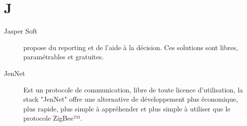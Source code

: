 \section{J}

\begin{description}

\item[Jasper Soft] propose du reporting et de l'aide à la décision. Ces solutions
sont libres, paramétrables et gratuites.

\item [JenNet]
Est un protocole de communication, libre de toute licence d'utilisation, 
la stack "JenNet" offre une alternative de développement plus économique, 
plus rapide, plus simple à appréhender et plus simple à utiliser que le protocole ZigBee™.

\end{description}
